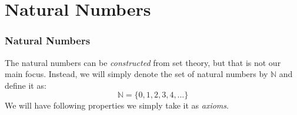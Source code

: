 \documentclass[12pt, t]{beamer}
\renewcommand{\emph}[1]{{\color{Turquoise3}\textsl{#1}}}
\begin{document}
\section{Natural Numbers}
\begin{frame}
    \frametitle{Natural Numbers}
    The natural numbers can be \emph{constructed} from set theory, but that is not our main focus.
    Instead, we will simply denote the set of natural numbers by $\mathbb{N}$ and define it as:
    \begin{equation*}
        \mathbb{N}=\{0,1,2,3,4,\dots\}
    \end{equation*}
    We will have following properties we simply take it as \emph{axioms}.
    \begin{table}
        \centering
    \end{table}
\end{frame}
\end{document}
